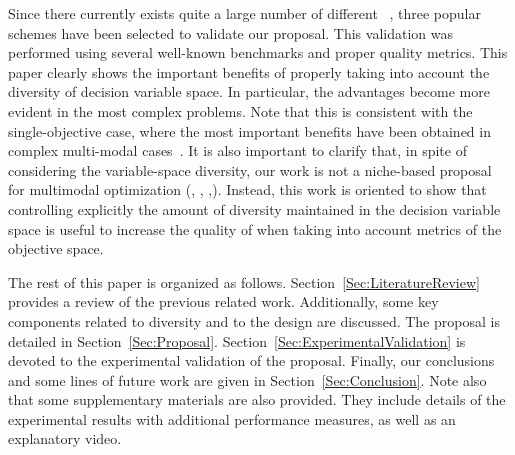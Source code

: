 Since there currently exists quite a large number of different \MOEAS{}~\citep{Joel:MOEA_APPLICATIONS_BOOK_KCTAN}, 
three popular schemes have been selected to validate our proposal.
%
This validation was performed using several well-known benchmarks and proper quality metrics.
%
This paper clearly shows the important benefits of properly taking into account the diversity of decision variable space.
%
In particular, the advantages become more evident in the most complex problems.
%
Note that this is consistent with the single-objective case, where the most important benefits have been obtained
in complex multi-modal cases~\citep{Segura:17}.
%
It is also important to clarify that, in spite of considering the variable-space diversity, our work is not a niche-based proposal
for multimodal optimization (\cite{deb2005omni}, \cite{zhou2009approximating}, \cite{li2016seeking},\cite{liang2016multimodal}).
%
Instead, this work is oriented to show that controlling explicitly the amount of diversity maintained in the decision variable space 
is useful to increase the quality of \MOEAS{} when taking into account metrics of the objective space.

The rest of this paper is organized as follows. 
%
Section~\ref{Sec:LiteratureReview} provides a review of the previous related work.
%
Additionally, some key components related to diversity and to the \VSDMOEA{} design are discussed.
%
The \VSDMOEA{} proposal is detailed in Section~\ref{Sec:Proposal}.
%
Section~\ref{Sec:ExperimentalValidation} is devoted to the experimental validation of the proposal.
%
Finally, our conclusions and some lines of future work are given in Section~\ref{Sec:Conclusion}.
%
Note also that some supplementary materials are also provided.
%
They include details of the experimental results with additional performance measures, 
as well as an explanatory video.
